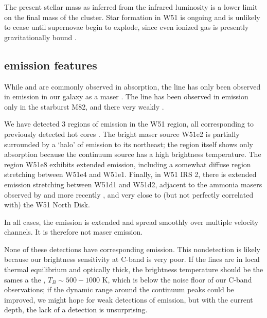 The present stellar mass as inferred from the infrared luminosity is a lower
limit on the final mass of the cluster.  Star formation in W51 is ongoing and
is unlikely to cease until supernovae begin to explode, since even ionized gas
is presently gravitationally bound
\citep{Ginsburg2012a,Bressert2012a,Ginsburg2015a}.



\subsection{\formaldehyde emission features}
While \formaldehyde \oneone and \twotwo are commonly observed in absorption,
the \oneone line has only been observed in emission in our galaxy as a maser
\citep{Araya2007b}.  The \twotwo line has been observed in emission only  in the
starburst M82, and there very weakly \citep{Mangum2008a}.

We have detected 3 regions of \twotwo emission in the W51 region, all
corresponding to previously detected hot \ammonia cores
\citep{Zhang1997a,Goddi2015a}.  The bright
maser source W51e2 is partially surrounded by a `halo' of \formaldehyde \twotwo
emission to its northeast; the \hchii region itself shows only \twotwo
absorption because the continuum source has a high brightness temperature.  The
\hchii region W51e8 exhibits extended \twotwo emission, including a somewhat
diffuse region stretching between W51e4 and W51e1.  Finally, in W51 IRS 2,
there is extended \twotwo emission stretching between W51d1 and W51d2, adjacent
to the ammonia masers observed by \citet{Zhang1995a} and more recently
\citet{Goddi2015a}, and very close to (but not perfectly correlated with) the
\citet{Zapata2010a} W51 North Disk.

In all cases, the emission is extended and spread smoothly over multiple
velocity channels.  It is therefore not maser emission.

None of these detections have corresponding \oneone emission.  This
nondetection is likely because our brightness sensitivity at C-band is very
poor.  If the
\formaldehyde lines are in local thermal equilibrium and optically thick, the
\oneone brightness temperature should be the sames a the \twotwo,
$T_B\sim500-1000$ K, which is below the noise floor of our C-band observations;
if the dynamic range around the continuum peaks could be improved, we might
hope for weak detections of \oneone emission, but with the current depth, the
lack of a detection is unsurprising.

